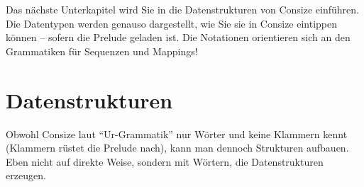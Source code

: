 Das nächste Unterkapitel wird Sie in die Datenstrukturen von Consize einführen. Die Datentypen werden genauso dargestellt, wie Sie sie in Consize eintippen können -- sofern die Prelude geladen ist. Die Notationen orientieren sich an den Grammatiken für Sequenzen und Mappings!






\section{Datenstrukturen}
\label{Sec:Datenstrukturen}

Obwohl Consize laut "`Ur-Grammatik"' nur Wörter und keine Klammern kennt (Klammern rüstet die Prelude nach), kann man dennoch Strukturen aufbauen. Eben nicht auf direkte Weise, sondern mit Wörtern, die Datenstrukturen erzeugen.

